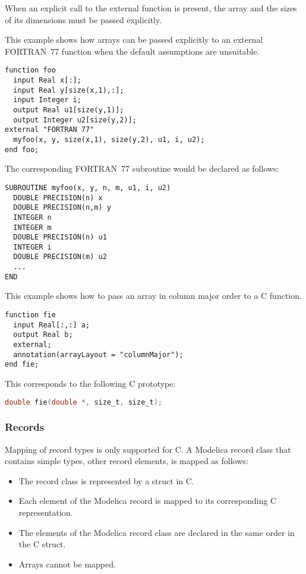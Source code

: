 When an explicit call to the external function is present, the array and
the sizes of its dimensions must be passed explicitly.

\begin{example}
This example shows how arrays can be passed explicitly to an
external FORTRAN~77 function when the default assumptions are
unsuitable.

\begin{lstlisting}[language=modelica]
function foo
  input Real x[:];
  input Real y[size(x,1),:];
  input Integer i;
  output Real u1[size(y,1)];
  output Integer u2[size(y,2)];
external "FORTRAN 77"
  myfoo(x, y, size(x,1), size(y,2), u1, i, u2);
end foo;
\end{lstlisting}
The corresponding FORTRAN~77 subroutine would be declared as follows:
\begin{lstlisting}[language=FORTRAN77]
SUBROUTINE myfoo(x, y, n, m, u1, i, u2)
  DOUBLE PRECISION(n) x
  DOUBLE PRECISION(n,m) y
  INTEGER n
  INTEGER m
  DOUBLE PRECISION(n) u1
  INTEGER i
  DOUBLE PRECISION(m) u2
  ...
END
\end{lstlisting}

This example shows how to pass an array in column major order to a C function.

\begin{lstlisting}[language=modelica]
function fie
  input Real[:,:] a;
  output Real b;
  external;
  annotation(arrayLayout = "columnMajor");
end fie;
\end{lstlisting}
This corresponds to the following C prototype:
\begin{lstlisting}[language=C]
double fie(double *, size_t, size_t);
\end{lstlisting}
\end{example}

\subsubsection{Records}\label{records}

Mapping of record types is only supported for C. A Modelica record class
that contains simple types, other record elements, is mapped as follows:
\begin{itemize}
\item
  The record class is represented by a struct in C.
\item
  Each element of the Modelica record is mapped to its corresponding C
  representation.
\item
  The elements of the Modelica record class are declared in the same
  order in the C struct.
\item
  Arrays cannot be mapped.
\end{itemize}

